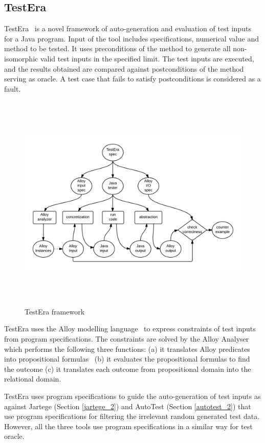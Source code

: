 \subsection{TestEra}
TestEra~\cite{marinov2001testera} is a novel framework of auto-generation and evaluation of test inputs for a Java program. Input of the tool includes specifications, numerical value and method to be tested. It uses preconditions of the method to generate all non-isomorphic valid test inputs in the specified limit. The test inputs are executed, and the results obtained are compared against postconditions of the method serving as oracle. A test case that fails to satisfy postconditions is considered as a fault. 
\begin{figure}[h]
	\centering
	\centerline{\includegraphics[width=15.5cm, height=10.5cm]{chapter2/TestEra.png}}
	\bigskip
	\caption{TestEra framework~\cite{marinov2001testera}}
	\label{fig:testera}
\end{figure}
\bigskip
TestEra uses the Alloy modelling language~\cite{jackson2001micromodularity} to express constraints of test inputs from program specifications. The constraints are solved by the Alloy Analyser~\cite{jackson2000alcoa} which performs the following three functions: (a) it translates Alloy predicates into propositional formulas~%
(b) it evaluates the propositional formulas to find the outcome (c) it translates each outcome from propositional domain into the relational domain.




TestEra uses program specifications to guide the auto-generation of test inputs as against Jartege (Section \ref{jartege_2}) and AutoTest (Section \ref{autotest_2}) that use program specifications for filtering the irrelevant random generated test data. However, all the three tools use program specifications in a similar way for test oracle. 


